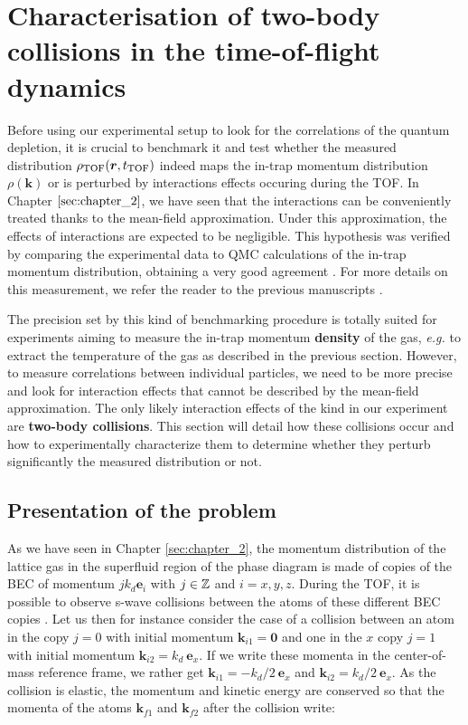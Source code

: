 \section{Characterisation of two-body collisions in the time-of-flight dynamics}

Before using our experimental setup to look for the \kmk correlations of the quantum depletion, it is crucial to benchmark it and test whether the measured distribution $\rho_{\rm{TOF}} (\bm{r},t_{\rm{TOF}})$ indeed maps the in-trap momentum distribution $\rho(\bm{k})$ or is perturbed by interactions effects occuring during the TOF. In Chapter $\ref{sec:chapter_2}$, we have seen that the interactions can be conveniently treated thanks to the mean-field approximation. Under this approximation, the effects of interactions are expected to be negligible. This hypothesis was verified by comparing the experimental data to QMC calculations of the in-trap momentum distribution, obtaining a very good agreement \cite{cayla2018single}. For more details on this measurement, we refer the reader to the previous manuscripts \cite{carcy_these,cayla_these}.

The precision set by this kind of benchmarking procedure is totally suited for experiments aiming to measure the in-trap momentum \textbf{density} of the gas, {\it e.g.} to extract the temperature of the gas as described in the previous section. However, to measure correlations between individual particles, we need to be more precise and look for interaction effects that cannot be described by the mean-field approximation. The only likely interaction effects of the kind in our experiment are \textbf{two-body collisions}. This section will detail how these collisions occur and how to experimentally characterize them to determine whether they perturb significantly the measured distribution or not.

\subsection{Presentation of the problem}

As we have seen in Chapter \ref{sec:chapter_2}, the momentum distribution of the lattice gas in the superfluid region of the phase diagram is made of copies of the BEC of momentum $j k_d \bm{e}_i$ with $j \in \mathbb{Z}$ and $i=x,y,z$. During the TOF, it is possible to observe s-wave collisions between the atoms of these different BEC copies \cite{greiner2001exploring}. Let us then for instance consider the case of a collision between an atom in the copy $j=0$ with initial momentum $\bm{k}_{i1}=\bm{0}$ and one in the $x$ copy $j=1$ with initial momentum $\bm{k}_{i2}=k_d \ \bm{e}_x$. If we write these momenta in the center-of-mass reference frame, we rather get $\bm{k}_{i1}=-k_d/2 \ \bm{e}_x$ and $ \bm{k}_{i2}=k_d/2 \ \bm{e}_x$. As the collision is elastic, the momentum and kinetic energy are conserved so that the momenta of the atoms $\bm{k}_{f1}$ and $\bm{k}_{f2}$ after the collision write:

